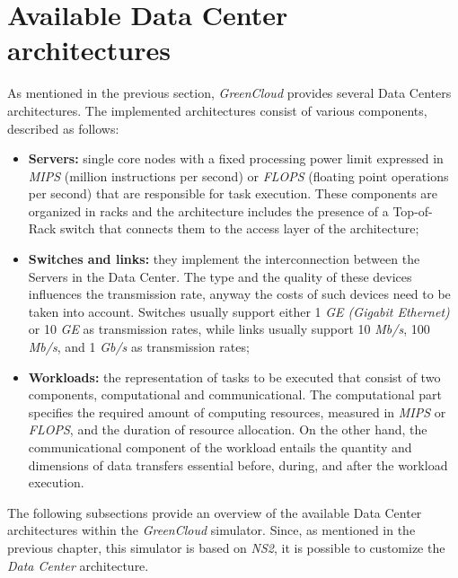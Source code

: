 \section{Available Data Center architectures} \label{chapter:architectures}
As mentioned in the previous section, \emph{GreenCloud} provides several Data Centers architectures. The implemented architectures consist of various components, described as follows:
\begin{itemize}
    \item \textbf{Servers: } single core nodes with a fixed processing power limit expressed in \emph{MIPS} (million instructions per second) or \emph{FLOPS} (floating point operations per second) that are responsible for task execution. These components are organized in racks and the architecture includes the presence of a Top-of-Rack switch that connects them to the access layer of the architecture;
    \item \textbf{Switches and links: } they implement the interconnection between the Servers in the Data Center. The type and the quality of these devices influences the transmission rate, anyway the costs of such devices need to be taken into account. Switches usually support either 1 \emph{GE (Gigabit Ethernet)} or 10 \emph{GE} as transmission rates, while links usually support 10 \emph{Mb/s}, 100 \emph{Mb/s}, and 1 \emph{Gb/s} as transmission rates;
    \item \textbf{Workloads: } the representation of tasks to be executed that consist of two components, computational and communicational. The computational part specifies the required amount of computing resources, measured in \emph{MIPS} or \emph{FLOPS}, and the duration of resource allocation. On the other hand, the communicational component of the workload entails the quantity and dimensions of data transfers essential before, during, and after the workload execution.
\end{itemize}
The following subsections provide an overview of the available Data Center architectures within the \emph{GreenCloud} simulator. Since, as mentioned in the previous chapter, this simulator is based on \emph{NS2}, it is possible to customize the \emph{Data Center} architecture. 

